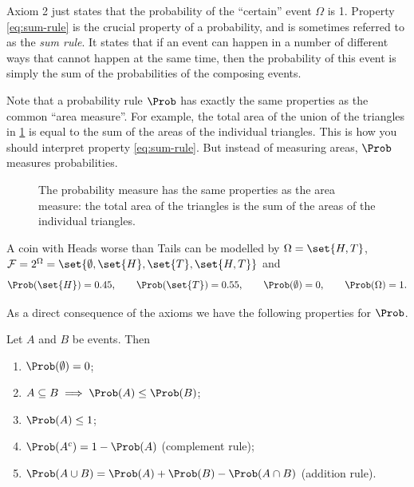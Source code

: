 Axiom 2 just states that the probability of the ``certain'' event $\Omega$ is 1. Property \eqref{eq:sum-rule} is the crucial property of a probability, and is sometimes referred to as the \emph{sum rule}. It states that if an event can happen in a number of different ways that cannot happen at the same time, then the probability of this event is simply the sum of the probabilities of the composing events.

Note that a probability rule $\Prob$ has exactly the same properties as the common ``area measure''. For example, the total area of the union of the triangles in \cref{fig:area-measure} is equal to the sum of the areas of the individual triangles. This is how you should interpret property \eqref{eq:sum-rule}. But instead of measuring areas, $\Prob$ measures probabilities.

\begin{figure}[ht]
\centering
{}
\caption{The probability measure has the same properties as the area measure: the total area of the triangles is the sum of the areas of the individual triangles.}
\label{fig:area-measure}
\end{figure}

\begin{example}\label{ex:unfair-coin}
A coin with Heads worse than Tails can be modelled by $\Omega = \set{H, T}$, $\mathcal{F} = 2^\Omega = \set{\emptyset, \set{H}, \set{T}, \set{H, T}}$ and
\[
  \Prob(\set{H}) = 0.45, \qquad \Prob(\set{T}) = 0.55, \qquad \Prob(\emptyset) = 0, \qquad \Prob(\Omega) = 1.
\]
\end{example}

As a direct consequence of the axioms we have the following properties for $\Prob$.

\begin{theorem}\label{thm:probability-properties}
Let $A$ and $B$ be events. Then
\begin{enumerate}
  \item $\Prob(\emptyset) = 0$;
  \item $A \subseteq B \implies \Prob(A) \le \Prob(B)$;
  \item $\Prob(A) \le 1$;
  \item $\Prob(A^c) = 1 - \Prob(A)$ (complement rule);
  \item $\Prob(A \cup B) = \Prob(A) + \Prob(B) - \Prob(A \cap B)$ (addition rule).
\end{enumerate}
\end{theorem}

